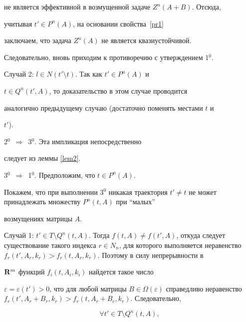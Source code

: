 \begin{pf}
не является эффективной в возмущенной задаче $Z^n(A+B)$. Отсюда,


учитывая $t'\in P^n(A)$, на основании свойства~\ref{pr1}


заключаем, что задача $Z^n(A)$ не является квазиустойчивой.


Следовательно, вновь приходим к противоречию с утверждением 1$^0$.





Случай 2: $l \in N(t' \setminus t)$. Так как $t'\in P^n(A)$ и


$t\in Q^n(t', A)$, то доказательство в этом случае проводится


аналогично предыдущему случаю (достаточно поменять местами $t$ и


$t'$).





2$^0$~$\Rightarrow$~3$^0$. Эта импликация непосредственно


следует из леммы \ref{lem2}.





3$^0$~$\Rightarrow$~1$^0$. Предположим, что $t \in P^n(A)$.


Покажем, что при выполнении 3$^0$ никакая траектория $t'


\neq t$ не может принадлежать множеству $P^n(t, A)$ при ``малых''


возмущениях матрицы $A$.





Случай 1: $ t' \in T\setminus Q^n(t, A)$. Тогда $f(t, A)\neq


f(t', A)$, откуда следует существование такого индекса $r \in


N_n$, для которого выполняется неравенство $f_r(t', A_r,


k_r)>f_r(t, A_r, k_r)$. Поэтому в силу непрерывности в


$\bold{R}^m$ функций $f_i(t, A_i, k_i)$ найдется такое число


$\varepsilon = \varepsilon(t')>0$, что для любой матрицы $B\in


\Omega(\varepsilon)$ справедливо неравенство $f_r(t', A_r+B_r,


k_r)>f_r(t, A_r+B_r, k_r)$. Следовательно,


\begin{equation}\label{theor2}


\forall t' \in T\setminus Q^n(t, A),



\end{equation}
\end{pf}
